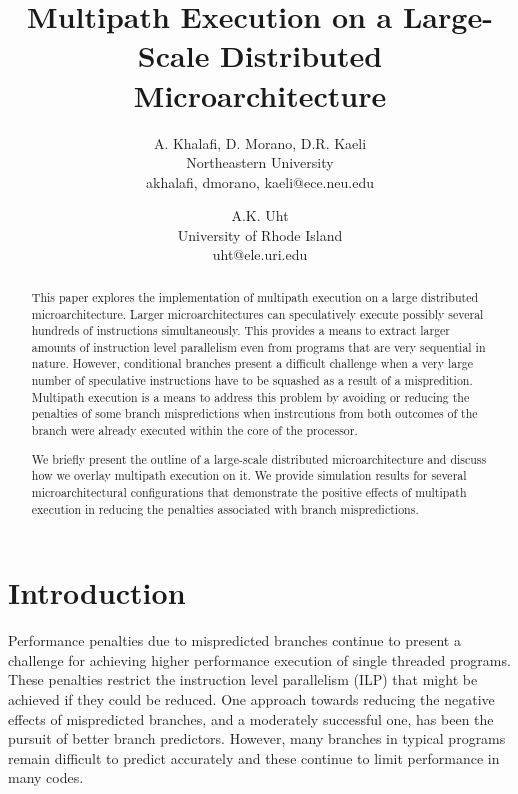 \documentclass[10pt,dvips]{article}
\begin{document}
\parskip 3mm
%
%
\title{Multipath Execution on a Large-Scale Distributed 
Microarchitecture}
%
\author{
A. Khalafi, D. Morano, D.R. Kaeli\\
Northeastern University\\
{akhalafi, dmorano, kaeli}@ece.neu.edu\\
\and
A.K. Uht \\
University of Rhode Island\\ uht@ele.uri.edu
}
%
\maketitle
\thispagestyle{empty}
%
\begin{abstract}
This paper explores the implementation of multipath execution on a
large distributed microarchitecture.  Larger microarchitectures can
speculatively execute possibly several hundreds of instructions
simultaneously.  This provides a means to extract larger amounts of
instruction level parallelism even from programs that are very
sequential in nature.  However, conditional branches present a
difficult challenge when a very large number of speculative
instructions have to be squashed as a result of a mispredition.
Multipath execution is a means to address this problem
by avoiding or reducing the penalties of some branch mispredictions when
instrcutions from both outcomes of the branch were
already executed within the core of the processor.

We briefly present the outline of a large-scale distributed
microarchitecture and discuss how we overlay multipath execution on
it.  We provide simulation results for several microarchitectural
configurations that demonstrate the positive effects of multipath
execution in reducing the penalties associated with branch
mispredictions.
\end{abstract}
%
\section{Introduction}
%
Performance penalties due to mispredicted branches continue to
present a challenge for achieving higher performance execution
of single threaded programs.
These penalties restrict the instruction level parallelism (ILP)
that might be achieved if they could be reduced.
One approach towards reducing the negative effects of mispredicted
branches, and a moderately successful one, has been the pursuit
of better branch predictors.  However, many branches in typical
programs remain difficult to predict accurately and these continue
to limit performance in many codes.
\end{document}
